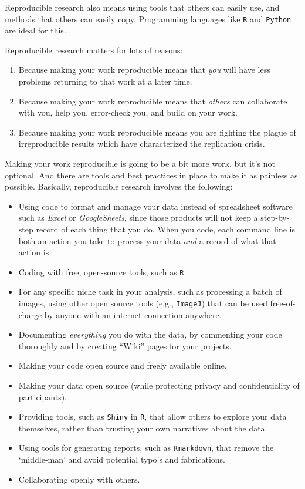 \documentclass[
]{book}
\providecommand{\tightlist}{%
  \setlength{\itemsep}{0pt}\setlength{\parskip}{0pt}}
\begin{document}
Reproducible research also means using tools that others can easily use, and methods that others can easily copy. Programming languages like \texttt{R} and \texttt{Python} are ideal for this.

Reproducible research matters for lots of reasons:

\begin{enumerate}
\def\labelenumi{\arabic{enumi}.}
\tightlist
\item
  Because making your work reproducible means that \emph{you} will have less problems returning to that work at a later time.\\
\item
  Because making your work reproducible means that \emph{others} can collaborate with you, help you, error-check you, and build on your work.\\
\item
  Because making your work reproducible means you are fighting the plague of irreproducible results which have characterized the replication crisis.
\end{enumerate}

Making your work reproducible is going to be a bit more work, but it's not optional. And there are tools and best practices in place to make it as painless as possible. Basically, reproducible research involves the following:

\begin{itemize}
\item
  Using code to format and manage your data instead of spreadsheet software such as \emph{Excel} or \emph{GoogleSheets}, since those products will not keep a step-by-step record of each thing that you do. When you code, each command line is both an action you take to process your data \emph{and} a record of what that action is.
\item
  Coding with free, open-source tools, such as \texttt{R}.
\item
  For any specific niche task in your analysis, such as processing a batch of images, using other open source tools (e.g., \texttt{ImageJ}) that can be used free-of-charge by anyone with an internet connection anywhere.
\item
  Documenting \emph{everything} you do with the data, by commenting your code thoroughly and by creating ``Wiki'' pages for your projects.
\item
  Making your code open source and freely available online.
\item
  Making your data open source (while protecting privacy and confidentiality of participants).
\item
  Providing tools, such as \texttt{Shiny} in \texttt{R}, that allow others to explore your data themselves, rather than trusting your own narratives about the data.
\item
  Using tools for generating reports, such as \texttt{Rmarkdown}, that remove the `middle-man' and avoid potential typo's and fabrications.
\item
  Collaborating openly with others.
\end{itemize}
\end{document}
